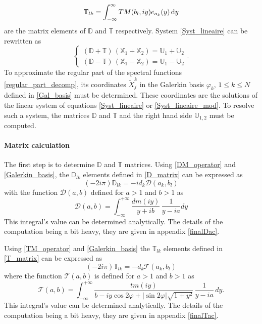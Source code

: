 \begin{equation}
\label{T_matrix}
\mathbb{T}_{lk} = \int_{-\infty}^\infty TM(b_l,iy) e_{a_k}(y) \, {\rm d} y
\end{equation}
are the matrix elements of $\mathbb{D}$ and $\mathbb{T}$ respectively. System \eqref{Syst_lineaire} can be rewritten as
\begin{equation}
\label{Syst_lineaire_mod}
\begin{cases}
(\mathbb{D} + \mathbb{T}) \, (\mathbb{X}_1 + \mathbb{X}_2) = \mathbb{U}_1 +  \mathbb{U}_2\\
(\mathbb{D} - \mathbb{T}) \, (\mathbb{X}_1 - \mathbb{X}_2) = \mathbb{U}_1 - \mathbb{U}_2
\end{cases}.
\end{equation}
To approximate the regular part of the spectral functions \eqref{regular_part_decomp}, its coordinates $\tilde{X}_j^k$ in the Galerkin basis $\varphi_k, \, 1 \leq k \leq N$ defined in \eqref{Gal_basis} must be determined. These coordinates are the solutions of the linear system of equations \eqref{Syst_lineaire} or \eqref{Syst_lineaire_mod}. To resolve such a system, the matrices $\mathbb{D}$ and $\mathbb{T}$ and the right hand side $\mathbb{U}_{1,2}$ must be computed. 

\paragraph{Matrix calculation}

The first step is to determine $\mathbb{D}$ and $\mathbb{T}$ matrices.
Using \eqref{DM_operator} and \eqref{Galerkin_basis}, the $\mathbb{D}_{lk}$ elements defined in \eqref{D_matrix} can be expressed as
\begin{equation}
\label{matrice_D}
(-2i\pi) \mathbb{D}_{lk} =  -i d_k \mathcal{D}(a_k,b_l)
\end{equation}
with the function $\mathcal{D}(a,b)$ defined for $a>1$ and $b>1$ as
\begin{equation}
\label{ldbis}
\mathcal{D}(a,b) = \int_{-\infty}^{+\infty} \dfrac{dm(iy)}{y + ib} \, \dfrac{1}{y -ia} dy 
\end{equation}
This integral's value can be determined analytically. The details of the computation being a bit heavy, they are given in appendix \ref{finalDac}.

Using \eqref{TM_operator} and \eqref{Galerkin_basis} the $\mathbb{T}_{lk}$ elements defined in \eqref{T_matrix} can be expressed as
\begin{equation}
\label{matrice_T}
(-2i\pi) \mathbb{T}_{lk} =  - d_k \mathcal{T}(a_k,b_l)
\end{equation}
where the function $\mathcal{T}(a,b)$ is defined for $a>1$ and $b>1$ as
\begin{equation}
\label{ltbis}
\mathcal{T}(a,b) = \int_{-\infty}^{+\infty} \dfrac{tm(iy)}{ b - iy \cos 2\varphi  + |\sin 2\varphi| \sqrt{1+y^2}} \, \dfrac{1}{y -i a} \, dy . 
\end{equation}
This integral's value can be determined analytically. The details of the computation being a bit heavy, they are given in appendix \ref{finalTac}.

